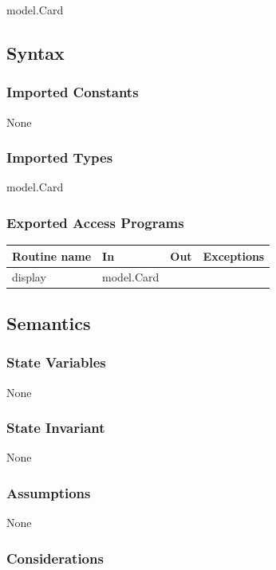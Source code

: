 \documentclass[12pt, titlepage]{article}
\begin{document}
model.Card

\subsection* {Syntax}

\subsubsection* {Imported Constants}

None

\subsubsection* {Imported Types}

model.Card

\subsubsection* {Exported Access Programs}

\begin{tabular}{| l | l | l | p{5cm} |}
\hline
\textbf{Routine name} & \textbf{In} & \textbf{Out} & \textbf{Exceptions}\\
\hline
display & model.Card & &\\
\hline  
\end{tabular}

\subsection* {Semantics}

\subsubsection* {State Variables}

None

\subsubsection* {State Invariant}

None

\subsubsection* {Assumptions}

None

\subsubsection* {Considerations}
\end{document}
